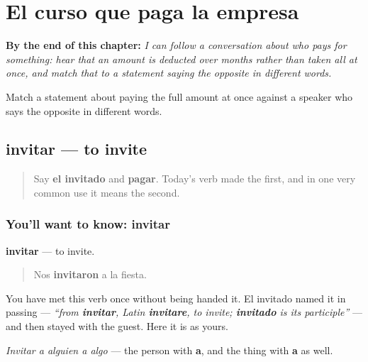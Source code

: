 
\chapter{El curso que paga la empresa}
\label{ch:es-pago}

\begin{chapteropening}
\textbf{By the end of this chapter:} \emph{I can follow a conversation about who pays for something: hear that an amount is deducted over months rather than taken all at once, and match that to a statement saying the opposite in different words.}

Match a statement about paying the full amount at once against a speaker who says the opposite in different words.
\end{chapteropening}

\section[invitar]{invitar — to invite}

\label{lesson:ES-C474-invitar}



\begin{quote}
Say \textbf{el invitado} and \textbf{pagar}. Today's verb made the first, and in one very common use it means the second.
\end{quote}

\subsection*{You'll want to know: invitar}
\textbf{invitar} — to invite.

\begin{quote}
Nos \textbf{invitaron} a la fiesta.
\end{quote}

You have met this verb once without being handed it. El invitado named it in passing — \emph{\textquotedblleft{}from \textbf{invitar}, Latin \textbf{invitare}, to invite; \textbf{invitado} is its participle\textquotedblright{}} — and then stayed with the guest. Here it is as yours.

\emph{Invitar a alguien a algo} — the person with \textbf{a}, and the thing with \textbf{a} as well.

